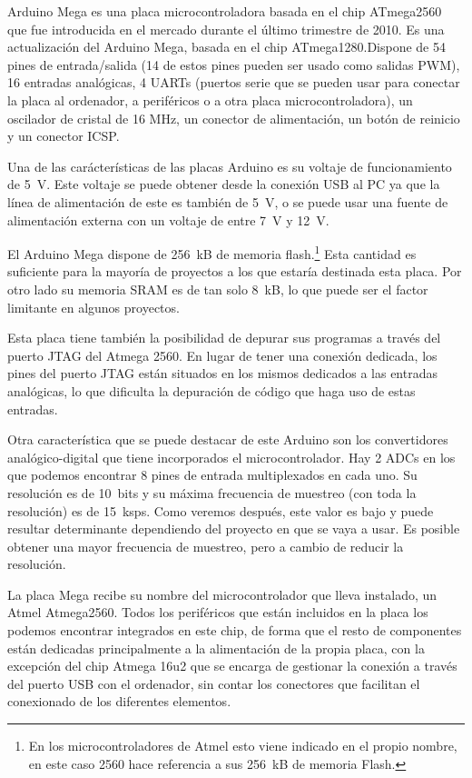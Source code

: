 
Arduino Mega es una placa microcontroladora basada en el chip ATmega2560 que fue introducida en el mercado durante el último trimestre de 2010.  
Es una actualización del Arduino Mega, basada en el chip ATmega1280.\@ Dispone de 54 pines de entrada/salida (14 de estos pines pueden ser usado como salidas PWM), 16 entradas analógicas, 4 UARTs (puertos serie que se pueden usar para conectar la placa al ordenador, a periféricos o a otra placa microcontroladora), un oscilador de cristal de 16 MHz, un conector de alimentación, un botón de reinicio y un conector ICSP.\@

Una de las carácterísticas de las placas Arduino es su voltaje de funcionamiento de 5~V. Este voltaje se puede obtener desde la conexión USB al PC ya que la línea de alimentación de este es también de 5~V, o se puede usar una fuente de alimentación externa con un voltaje de entre 7~V y 12~V.

El Arduino Mega dispone de 256~kB de memoria flash.\footnote{En los microcontroladores de Atmel esto viene indicado en el propio nombre, en este caso 2560 hace referencia a sus 256~kB de memoria Flash.} Esta cantidad es suficiente para la mayoría de proyectos a los que estaría destinada esta placa. Por otro lado su memoria SRAM es de tan solo 8~kB, lo que puede ser el factor limitante en algunos proyectos.

Esta placa tiene también la posibilidad de depurar sus programas a través del puerto JTAG del Atmega 2560. En lugar de tener una conexión dedicada, los pines del puerto JTAG están situados en los mismos dedicados a las entradas analógicas, lo que dificulta la depuración de código que haga uso de estas entradas.

Otra característica que se puede destacar de este Arduino son los convertidores analógico-digital que tiene incorporados el microcontrolador. Hay 2 ADCs en los que podemos encontrar 8 pines de entrada multiplexados en cada uno. Su resolución es de 10~bits y su máxima frecuencia de muestreo (con toda la resolución) es de 15~ksps. Como veremos después, este valor es bajo y puede resultar determinante dependiendo del proyecto en que se vaya a usar. Es posible obtener una mayor frecuencia de muestreo, pero a cambio de reducir la resolución.

La placa Mega recibe su nombre del microcontrolador que lleva instalado, un Atmel Atmega2560. Todos los periféricos que están incluidos en la placa los podemos encontrar integrados en este chip, de forma que el resto de componentes están dedicadas principalmente a la alimentación de la propia placa, con la excepción del chip Atmega 16u2 que se encarga de gestionar la conexión a través del puerto USB con el ordenador, sin contar los conectores que facilitan el conexionado de los diferentes elementos.

